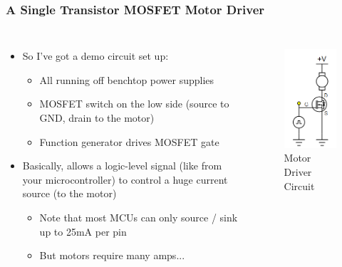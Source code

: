 \documentclass{beamer}
\begin{document}
\begin{frame}
\frametitle{A Single Transistor MOSFET Motor Driver}
\begin{columns}[t]
\begin{itemize}
  \item So I've got a demo circuit set up:
  \begin{itemize}
    \item All running off benchtop power supplies
    \item MOSFET switch on the low side (source to GND, drain to the motor)
    \item Function generator drives MOSFET gate
  \end{itemize}
  \item Basically, allows a logic-level signal (like from your microcontroller) to control a huge current source (to the motor)
  \begin{itemize}
    \item Note that most MCUs can only source / sink up to 25mA per pin
    \item But motors require many amps...
  \end{itemize}
\end{itemize}

\begin{figure}
  \centering
  \includegraphics[scale=0.33]{images-dis3/driverckt-lowside} \\
  Motor Driver Circuit
\end{figure}
\end{columns}
\end{frame}
\end{document}
